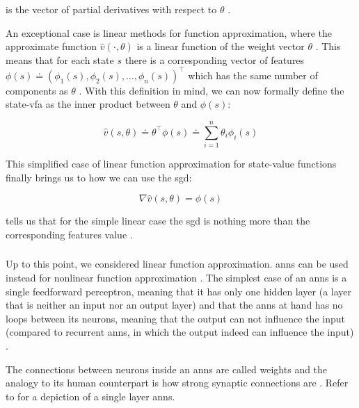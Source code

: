 \documentclass{seal_thesis}
\begin{document}
is the vector of partial derivatives with respect to $\theta$ \cite[p. 195]{Sutton2017}.

An exceptional case is linear methods for function approximation, where the approximate function $\hat{v} (\cdot ,\theta)$ is a linear function of the weight vector $\theta$ \cite[p. 198]{Sutton2017}. This means that for each state $s$ there is a corresponding vector of features $\phi (s) \doteq \left( \phi_1 (s), \phi_2 (s), \ldots, \phi_n (s) \right)^\top$ which has the same number of components as $\theta$ \cite[p. 198]{Sutton2017}. With this definition in mind, we can now formally define the state-\gls{vfa} as the inner product between $\theta$ and $\phi (s)$:

\begin{equation}
\label{eq:function_approximation_dot}
	\hat{v} (s,\theta) \doteq \theta^\top \phi (s) \doteq \sum_{i=1}^n \theta_i \phi_i (s)
\end{equation}

This simplified case of linear function approximation for state-value functions finally brings us to how we can use the \gls{sgd}:

\begin{equation}
\label{eq:sgd_linear}
	\nabla \hat{v} (s,\theta) = \phi (s)
\end{equation}

 tells us that for the simple linear case the \gls{sgd} is nothing more than the corresponding features value  \cite[p. 199]{Sutton2017}.

\subsubsection{}
\label{subsubsec:ann_theory}

Up to this point, we considered linear function approximation. \glspl{ann} can be used instead for nonlinear function approximation \cite[p. 199]{Sutton2017}. The simplest case of an \glspl{ann} is a single feedforward perceptron, meaning that it has only one hidden layer (\ie a layer that is neither an input nor an output layer) and that the \glspl{ann} at hand has no loops between its neurons, meaning that the output can not influence the input (compared to recurrent \glspl{ann}, in which the output indeed can influence the input) \cite[p. 216]{Sutton2017}. 

The connections between neurons inside an \glspl{ann} are called weights and the analogy to its human counterpart is how strong synaptic connections are \cite[p. 216]{Sutton2017}. Refer to  for a depiction of a single layer \glspl{ann}.
\end{document}
